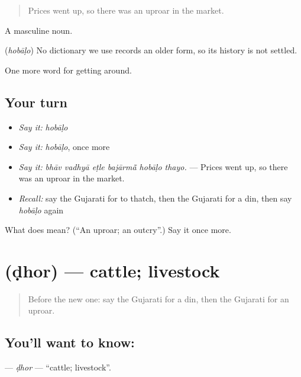 \begin{quote}
Prices went up, so there was an uproar in the market.
\end{quote}

A masculine noun.

\begin{cousinweb}
\textbf{} (\emph{hobāḷo}) No dictionary we use records an older form, so its history is not settled.
\end{cousinweb}

\begin{grammarlens}[title={What you've built}]
One more word for getting around.
\end{grammarlens}

\subsection*{Your turn}
\begin{itemize}
\raggedright
  \item \emph{Say it:} \emph{hobāḷo}
  \item \emph{Say it:} \emph{hobāḷo}, once more
  \item \emph{Say it:} \emph{bhāv vadhyā eṭle bajārmā̃ hobāḷo thayo.} — Prices went up, so there was an uproar in the market.
  \item \emph{Recall:} say the Gujarati for to thatch, then the Gujarati for a din, then say \emph{hobāḷo} again
\end{itemize}

\begin{tcolorbox}[breakable,colback=teal!4,colframe=teal!35!black,title={Before you move on}]
What does  mean? (\textquotedblleft{}An uproar; an outcry\textquotedblright{}.) Say it once more.
\end{tcolorbox}
\section[\texorpdfstring{\gu{ઢોર} (ḍhor)}{ઢોર (ḍhor)}]{ (ḍhor) — cattle; livestock}

\label{lesson:GU-C421-dhor}



\begin{quote}
Before the new one: say the Gujarati for a din, then the Gujarati for an uproar.
\end{quote}

\subsection*{You'll want to know: }
\textbf{} — \emph{ḍhor} — \textquotedblleft{}cattle; livestock\textquotedblright{}.

